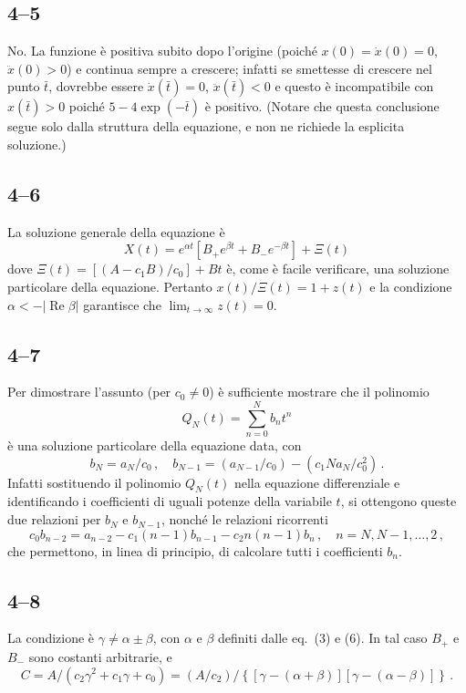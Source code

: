 \documentclass[11pt, a4paper]{book}
\numberwithin{equation}{section}
\begin{document}
\subsection*{4--5}
No. La funzione è positiva subito dopo l'origine (poiché $x(0) = \dot{x}(0) = 0$,
$\ddot{x}(0) > 0$) e continua sempre a crescere; infatti se smettesse di crescere
nel punto $\bar{t}$, dovrebbe essere $\dot{x}(\bar{t}) = 0$, $\ddot{x}(\bar{t}) < 0$ e questo è
incompatibile con $x(\bar{t}) > 0$ poiché $5-4\exp(-\bar{t})$ è positivo. (Notare che
questa conclusione segue solo dalla struttura della equazione, e non ne richiede
la esplicita soluzione.)

\subsection*{4--6}
La soluzione generale della equazione è
\[
    X(t) = e^{\alpha t}\left[ B_+ e^{\beta t} + B_- e^{-\beta t} \right] + \Xi(t)
\]
dove $\Xi(t) = [(A - c_1 B)/c_0] + Bt$ è, come è facile verificare, una soluzione
particolare della equazione. Pertanto $x(t)/\Xi(t) = 1 + z(t)$ e la condizione
$\alpha < -|\operatorname{Re}\beta|$ garantisce che $\lim_{t\to\infty} z(t) = 0$.

\subsection*{4--7}
Per dimostrare l'assunto (per $c_0 \neq 0$) è sufficiente mostrare che il polinomio
\[
    Q_N(t) = \sum_{n=0}^{N} b_n t^n
\]
è una soluzione particolare della equazione data, con
\[
    b_N = a_N/c_0 \,, \quad b_{N-1} = (a_{N-1}/c_0) - (c_1 N a_N / c_0^2) \,.
\]
Infatti sostituendo il polinomio $Q_N(t)$ nella equazione differenziale e
identificando i coefficienti di uguali potenze della variabile $t$, si ottengono
queste due relazioni per $b_N$ e $b_{N-1}$, nonché le relazioni ricorrenti
\[
    c_0 b_{n-2} = a_{n-2} - c_1(n-1) b_{n-1} - c_2 n(n-1) b_n \,, \quad n = N, N-1, \ldots, 2 \,,
\]
che permettono, in linea di principio, di calcolare tutti i coefficienti $b_n$.

\subsection*{4--8}
La condizione è $\gamma \neq \alpha \pm \beta$, con $\alpha$ e $\beta$ definiti dalle eq.~(3) e (6).
In tal caso $B_+$ e $B_-$ sono costanti arbitrarie, e
\[
    C = A/(c_2\gamma^2 + c_1\gamma + c_0) = (A/c_2) / \left\{ [\gamma-(\alpha+\beta)][\gamma-(\alpha-\beta)] \right\} \,.
\]
\end{document}
